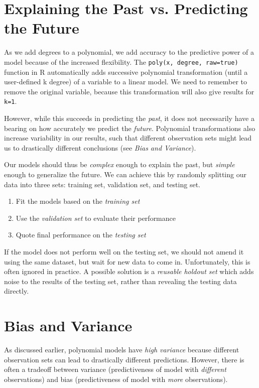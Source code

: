 \section{Explaining the Past vs. Predicting the Future}

As we add degrees to a polynomial, we add accuracy to the predictive power of a model because of the increased flexibility. The \texttt{poly(x,\ degree,\ raw=true)} function in R automatically adds successive polynomial transformation (until a user-defined k degree) of a variable to a linear model. We need to remember to remove the original variable, because this transformation will also give results for \texttt{k=1}.

However, while this succeeds in predicting the \emph{past}, it does not necessarily have a bearing on how accurately we predict the \emph{future}. Polynomial transformations also increase variability in our results, such that different observation sets might lead us to drastically different conclusions (see \emph{Bias and Variance}).

Our models should thus be \emph{complex} enough to explain the past, but \emph{simple} enough to generalize the future. We can achieve this by randomly splitting our data into three sets: training set, validation 
set, and testing set. \begin{enumerate}
\item Fit the models based on the \emph{training set}
\item Use the \emph{validation set} to evaluate their performance
\item Quote final performance on the \emph{testing set} \end{enumerate}

If the model does not perform well on the testing set, we should not amend it using the same dataset, but wait for new data to come in. Unfortunately, this is often ignored in practice. A possible solution is a \emph{reusable holdout set} which adds noise to the results of the testing set, rather than revealing the testing data directly.

\section{Bias and Variance}

As discussed earlier, polynomial models have \emph{high variance} because different observation sets can lead to drastically different predictions. However, there is often a tradeoff between variance (predictiveness of model with \emph{different} observations) and bias (predictiveness of model with \emph{more} observations).

